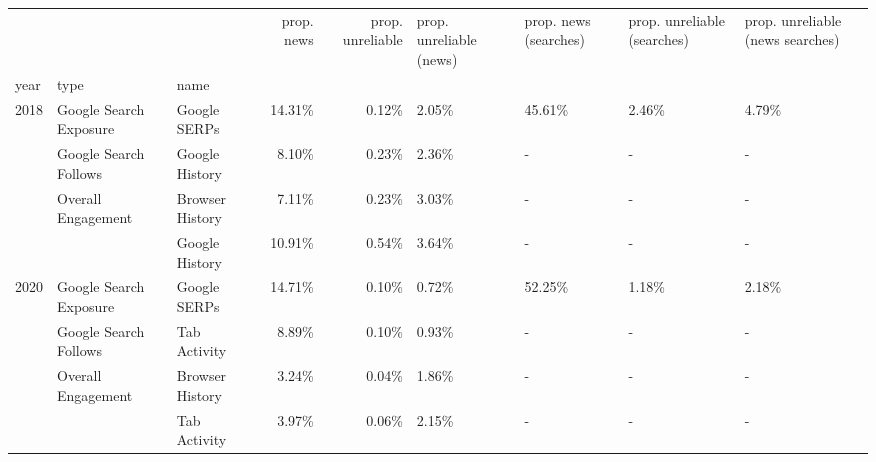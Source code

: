 \begin{tabular}{lllrrllll}
 &  &  & prop. news & prop. unreliable & prop. unreliable (news) & prop. news (searches) & prop. unreliable (searches) & prop. unreliable (news searches) \\
year & type & name &  &  &  &  &  &  \\
\multirow[c]{4}{*}{2018} & Google Search Exposure & Google SERPs & 14.31\% & 0.12\% & 2.05\% & 45.61\% & 2.46\% & 4.79\% \\
 & Google Search Follows & Google History & 8.10\% & 0.23\% & 2.36\% & - & - & - \\
 & \multirow[c]{2}{*}{Overall Engagement} & Browser History & 7.11\% & 0.23\% & 3.03\% & - & - & - \\
 &  & Google History & 10.91\% & 0.54\% & 3.64\% & - & - & - \\
\multirow[c]{4}{*}{2020} & Google Search Exposure & Google SERPs & 14.71\% & 0.10\% & 0.72\% & 52.25\% & 1.18\% & 2.18\% \\
 & Google Search Follows & Tab Activity & 8.89\% & 0.10\% & 0.93\% & - & - & - \\
 & \multirow[c]{2}{*}{Overall Engagement} & Browser History & 3.24\% & 0.04\% & 1.86\% & - & - & - \\
 &  & Tab Activity & 3.97\% & 0.06\% & 2.15\% & - & - & - \\
\end{tabular}
